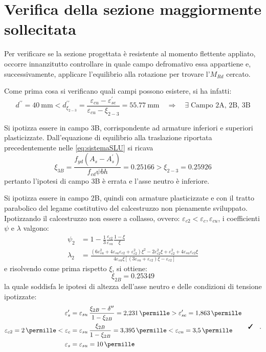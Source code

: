 \section{Verifica della sezione maggiormente sollecitata}
Per verificare se la sezione progettata è resistente al momento flettente appliato, occorre innanzitutto controllare in quale campo defromativo essa appartiene e, successivamente, applicare l'equilibrio alla rotazione per trovare l'$M_{Rd}$ cercato.

Come prima cosa si verificano quali campi possono esistere, si ha infatti:
\begin{equation}
  d^{\prime\prime} = \SI{40}{\milli\metre} <  d^{\prime\prime}_{\xi_{2-3}} = \frac{\varepsilon_{cu} - \varepsilon_{se}^\prime}{\varepsilon_{cu} - \xi_{2-3}} =\SI{55.77}{\milli\metre} \quad \Longrightarrow  \quad \exists \; \text{Campo 2A, 2B, 3B}
\end{equation}

Si ipotizza essere in campo 3B, corrispondente ad armature inferiori e superiori plasticizzate.
Dall'equazione di equilibrio alla traslazione riportata precedentemente nelle \ref{eq:sistemaSLU} si ricava
\[
  \xi_{3B} = \frac{f_{yd} (A_s - A_s^\prime)}{f_{cd} \psi b h} = \num{0.25166} > \xi_{2-3} = \num{0.25926}
\]
pertanto l'ipotesi di campo 3B è errata e l'asse neutro è inferiore.

Si ipotizza essere in campo 2B, quindi con armature plasticizzate e con il tratto parabolico del legame costitutivo del calcestruzzo non pienamente sviluppato.
Ipotizzando il calcestruzzo non essere a collasso, ovvero: $\varepsilon_{c2} < \varepsilon_{c} , \varepsilon_{cu}$, i coefficienti $\psi$ e $\lambda$ valgono:
\[
  \begin{split}
    \psi_{2} &= 1 - \frac{1}{3}   \frac{\varepsilon_{c2}}{\varepsilon_{su}}\frac{1-\xi}{\xi}\\
    \lambda_{2} &= \frac{\left( 6\varepsilon_{su}^2 + 4\varepsilon_{su}\varepsilon_{c2} + \varepsilon_{c2}^2 \right)\xi^2 -2\varepsilon_{c2}^2 \xi + \varepsilon_{c2}^2 + 4\varepsilon_{su}\varepsilon_{c2}\xi}{4\varepsilon_{su}\xi \left[ \left( 3\varepsilon_{su} + \varepsilon_{c2} \right)\xi - \varepsilon_{c2} \right]}
  \end{split}  
\]
e risolvendo come prima rispetto $\xi$, si ottiene:
\begin{equation}
  \xi_{2B} = \num{0.25349}
\end{equation}
la quale soddisfa le ipotesi di altezza dell'asse neutro e delle condizioni di tensione ipotizzate:
\begin{equation}
  \begin{split}
    \varepsilon_{s}^\prime &= \varepsilon_{su}\,\frac{\xi_{2B} - \delta^{\prime\prime}}{1-\xi_{2B}} = \SI{2.231}{\permille} > \varepsilon_{se}^\prime = \SI{1.863}{\permille}\\
    \varepsilon_{c2} = \SI{2}{\permille} < \varepsilon_{c} &= \varepsilon_{su} \,\frac{\xi_{2B}}{1-\xi_{2B}} =  \SI{3.395}{\permille} < \varepsilon_{cu} = \SI{3.5}{\permille}\\
    \varepsilon_{s} &= \varepsilon_{su} = \SI{10}{\permille}
  \end{split}
  \quad \checked \quad .
\end{equation}

